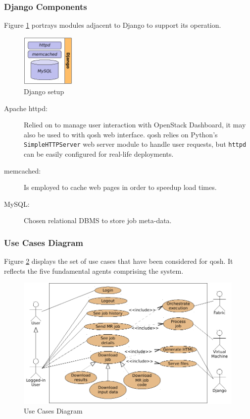 \subsubsection{Django Components}\label{subsubsec:componentesdjango}
\noindent Figure \ref{fig:instalaciondjango} portrays modules adjacent to Django to support its operation.

\begin{figure}[bp]
\begin{center}
\includegraphics[width=0.23\textwidth]{imagenes/024.pdf}
 \caption{Django setup}
\label{fig:instalaciondjango}
\end{center}
\end{figure}

\begin{description}
 \item[Apache httpd:] Relied on to manage user interaction with OpenStack Dashboard, it may also be used to with qosh web interface. qosh relies on Python's \texttt{SimpleHTTPServer} web server module to handle user requests, but \texttt{httpd} can be easily configured for real-life deployments.
 \item[memcached:] Is employed to cache web pages in order to speedup load times.
 \item[MySQL:] Chosen relational DBMS to store job meta-data.
\end{description}


\subsubsection{Use Cases Diagram}\label{subsubsec:casosuso}
\noindent Figure \ref{fig:casosuso} displays the set of use cases that have been considered for qosh. It reflects the five fundamental agents comprising the system.

\begin{figure}[tbp]
\begin{center}
\includegraphics[width=0.99\textwidth]{imagenes/025.pdf}
 \caption{Use Cases Diagram}
\label{fig:casosuso}
\end{center}
\end{figure}

